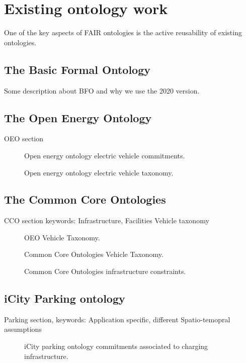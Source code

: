 
\section{Existing ontology work}
\label{existingontologies}

One of the key aspects of FAIR ontologies is the active reusability of existing
ontologies.

\subsection{The Basic Formal Ontology}

Some description about BFO and why we use the 2020 version.

\subsection{The Open Energy Ontology}

OEO section

\begin{figure}[h]
    \caption{Open energy ontology electric vehicle commitments.}
    \centering
    
\end{figure}

\begin{figure}[h]
    \caption{Open energy ontology electric vehicle taxonomy.}
    \centering
    
\end{figure}

\subsection{The Common Core Ontologies}

CCO section keywords: Infrastructure, Facilities Vehicle taxonomy

\begin{figure}[h]
    \caption{OEO Vehicle Taxonomy.}
    \centering
    
\end{figure}

\begin{figure}[h]
    \caption{Common Core Ontologies Vehicle Taxonomy.}
    \centering
    
\end{figure}


\begin{figure}[h]
    \caption{Common Core Ontologies infrastructure constraints.}
    \centering
    
\end{figure}



\subsection{iCity Parking ontology}

Parking section, keywords: Application specific, different Spatio-temopral assumptions

\begin{figure}[h]
    \caption{iCity parking ontology commitments associated to charging infrastructure.}
    \centering
    
\end{figure}
